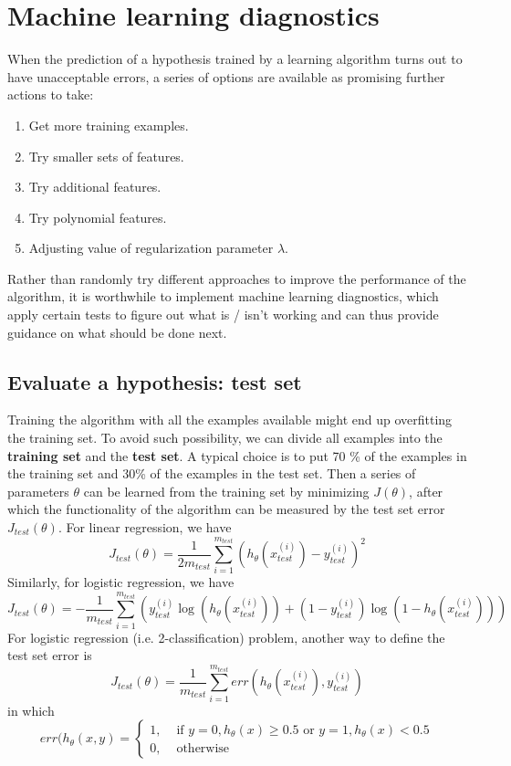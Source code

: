 \ifx\PREAMBLE\undefined


\fi
\section{Machine learning diagnostics}
When the prediction of a hypothesis trained by a learning algorithm turns out to have unacceptable errors, a series of options are available as promising further actions to take:
\begin{enumerate}
\item Get more training examples.
\item Try smaller sets of features.
\item Try additional features.
\item Try polynomial features.
\item Adjusting value of regularization parameter $\lambda$.
\end{enumerate}
Rather than randomly try different approaches to improve the performance of the algorithm, it is worthwhile to implement machine learning diagnostics, which apply certain tests to figure out what is / isn't working and can thus provide guidance on what should be done next.
\subsection{Evaluate a hypothesis: test set}
Training the algorithm with all the examples available might end up overfitting the training set. To avoid such possibility, we can divide all examples into the {\bf training set} and the {\bf test set}. A typical choice is to put 70
\% of the examples in the training set and 30\% of the examples in the test set. Then a series of parameters $\theta$ can be learned from the training set by minimizing $J(\theta)$, after which the functionality of the algorithm can be measured by the test set error $J_{test}(\theta)$. For linear regression, we have 
$$J_{test}(\theta) = \frac{1}{2m_{test}}\sum\limits_{i=1}^{m_{test}}(h_{\theta}(x^{(i)}_{test}) - y^{(i)}_{test})^2$$
Similarly, for logistic regression, we have 
\begin{equation}\label{jtestlor}
J_{test}(\theta) = -\frac{1}{m_{test}}\sum\limits_{i=1}^{m_{test}}(y^{(i)}_{test}\log(h_{\theta}(x^{(i)}_{test})) +(1 - y^{(i)}_{test})\log(1-h_{\theta}(x^{(i)}_{test})))
\end{equation}
For logistic regression (i.e. 2-classification) problem, another way to define the test set error is 
$$J_{test}(\theta) = \frac{1}{m_{test}}\sum\limits_{i=1}^{m_{test}}err(h_{\theta}(x^{(i)}_{test}),y^{(i)}_{test})$$
in which 
\begin{equation*}
err(h_{\theta}(x,y) = \left\{
\begin{aligned}
1,&\text{ if }y = 0, h_{\theta}(x) \ge 0.5 \text{ or } y = 1, h_{\theta}(x) < 0.5\\
0,&\text{ otherwise}
\end{aligned}
\right.
\end{equation*}
